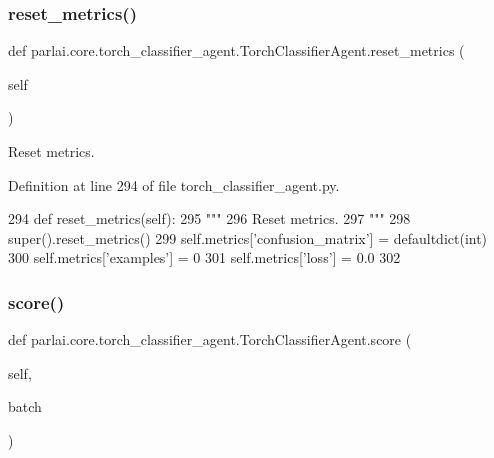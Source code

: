 \subsubsection{\texorpdfstring{reset\+\_\+metrics()}{reset\_metrics()}}
{\footnotesize\ttfamily def parlai.\+core.\+torch\+\_\+classifier\+\_\+agent.\+Torch\+Classifier\+Agent.\+reset\+\_\+metrics (\begin{DoxyParamCaption}\item[{}]{self }\end{DoxyParamCaption})}

\begin{DoxyVerb}Reset metrics.
\end{DoxyVerb}
 

Definition at line 294 of file torch\+\_\+classifier\+\_\+agent.\+py.


\begin{DoxyCode}
294     \textcolor{keyword}{def }reset\_metrics(self):
295         \textcolor{stringliteral}{"""}
296 \textcolor{stringliteral}{        Reset metrics.}
297 \textcolor{stringliteral}{        """}
298         super().reset\_metrics()
299         self.metrics[\textcolor{stringliteral}{'confusion\_matrix'}] = defaultdict(int)
300         self.metrics[\textcolor{stringliteral}{'examples'}] = 0
301         self.metrics[\textcolor{stringliteral}{'loss'}] = 0.0
302 
\end{DoxyCode}
\mbox{\label{classparlai_1_1core_1_1torch__classifier__agent_1_1TorchClassifierAgent_a04e97e79ef7e497c0927c10b31e42337}} 
\subsubsection{\texorpdfstring{score()}{score()}}
{\footnotesize\ttfamily def parlai.\+core.\+torch\+\_\+classifier\+\_\+agent.\+Torch\+Classifier\+Agent.\+score (\begin{DoxyParamCaption}\item[{}]{self,  }\item[{}]{batch }\end{DoxyParamCaption})}

